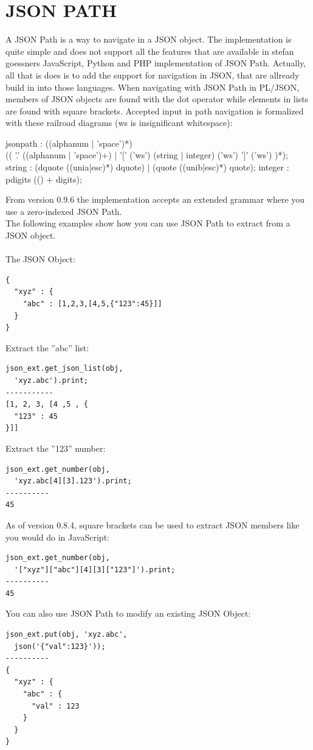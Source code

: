 \documentclass[11pt,a4paper]{article}
\begin{document}
\section{JSON PATH}
A JSON Path is a way to navigate in a JSON object. The implementation is quite simple and does not support all the features that are available in stefan goessners JavaScript, Python and PHP implementation of JSON Path. Actually, all that is does is to add the support for navigation in JSON, that are allready build in into those languages. When navigating with JSON Path in PL/JSON, members of JSON objects are found with the dot operator while elements in lists are found with square brackets. Accepted input in path navigation is formalized with these railroad diagrams (ws is insignificant whitespace):
\begin{rail}
jsonpath : ((alphanum | 'space')*) \\(( '.' ((alphanum | 'space')+) | '[' ('ws') (string | integer) ('ws') ']' ('ws') )*);
string   : (dquote ((unia|esc)*) dquote) | (quote ((unib|esc)*) quote);
integer  : pdigits (() + digits);
\end{rail}
From version 0.9.6 the implementation accepts an extended grammar where you use a zero-indexed JSON Path.\\
The following examples show how you can use JSON Path to extract from a JSON object.\\\\
The JSON Object:
\begin{verbatim}
{
  "xyz" : {
    "abc" : [1,2,3,[4,5,{"123":45}]]
  }
}
\end{verbatim}
Extract the ''abc'' list:
\begin{verbatim}
json_ext.get_json_list(obj, 
  'xyz.abc').print;
-----------
[1, 2, 3, [4 ,5 , {
  "123" : 45
}]]
\end{verbatim}
Extract the ''123'' number:
\begin{verbatim}
json_ext.get_number(obj,
  'xyz.abc[4][3].123').print;
----------
45
\end{verbatim}
As of version 0.8.4, square brackets can be used to extract JSON members like you would do in JavaScript: 
\begin{verbatim}
json_ext.get_number(obj,
  '["xyz"]["abc"][4][3]["123"]').print;
----------
45
\end{verbatim}
You can also use JSON Path to modify an existing JSON Object:
\begin{verbatim}
json_ext.put(obj, 'xyz.abc',
  json('{"val":123}'));
----------
{
  "xyz" : {
    "abc" : {
      "val" : 123
    }
  }
}
\end{verbatim}
\end{document}

